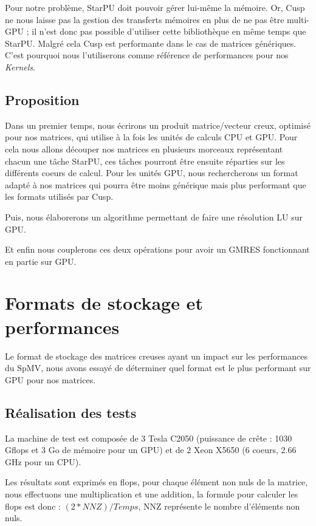 \documentclass[a4paper,11pt]{report}
\begin{document}
   Pour notre problème, StarPU doit pouvoir
   gérer lui-même la mémoire. Or, Cusp ne nous laisse
   pas la gestion des transferts mémoires en plus de ne pas être
   multi-GPU ; il n'est donc pas possible d'utiliser cette bibliothèque
   en même temps que StarPU.
   Malgré cela Cusp est performante dans le cas de
   matrices génériques. C'est pourquoi nous l'utiliserons comme référence de
   performances pour nos \textit{Kernels}.

 \section{Proposition}
  Dans un premier temps, nous écrirons un produit matrice/vecteur creux,
  optimisé pour nos matrices, qui utilise à la fois les unités de
  calculs CPU et GPU. Pour cela nous allons découper nos matrices en
  plusieurs morceaux représentant chacun une tâche StarPU,
  ces tâches pourront être ensuite réparties sur les différents coeurs
  de calcul. Pour les unités GPU, nous rechercherons un format adapté à nos
  matrices qui pourra être moins générique mais plus performant que
  les formats utilisés par Cusp.

  Puis, nous élaborerons un algorithme permettant de faire une
  résolution LU sur GPU.

  Et enfin nous couplerons ces deux opérations pour avoir un GMRES
  fonctionnant en partie sur GPU.

\chapter{Formats de stockage et performances}
 Le format de stockage des matrices creuses ayant un impact sur les
 performances du SpMV, nous avons essayé de déterminer quel 
 format est le plus performant sur GPU pour nos matrices.

 \section{Réalisation des tests}
  La machine de test est composée de 3 Tesla C2050 (puissance de crête :
  1030 Gflops et 3 Go de mémoire pour un GPU) et de 2 Xeon X5650 (6 coeurs,
  2.66 GHz pour un CPU).

  Les résultats sont exprimés en flops, pour chaque élément non nuls
  de la matrice, nous effectuons une multiplication et une addition, la
  formule pour calculer les flops est donc : $(2 * NNZ) / Temps$, NNZ
  représente le nombre d'éléments non nuls.
  
\end{document}
